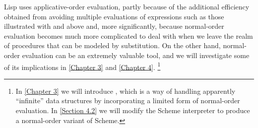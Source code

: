 Lisp uses applicative-order evaluation, partly because of the additional efficiency obtained from avoiding multiple evaluations of expressions such as those illustrated with  and  above and, more significantly, because normal-order evaluation becomes much more complicated to deal with when we leave the realm of procedures that can be modeled by substitution.
On the other hand, normal-order evaluation can be an extremely valuable tool, and we will investigate some of its implications in \cref{Chapter 3} and \cref{Chapter 4}.%
\footnote{
	In \cref{Chapter 3} we will introduce , which is a way of handling apparently “infinite” data structures by incorporating a limited form of normal-order evaluation.
	In \cref{Section 4.2} we will modify the Scheme interpreter to produce a normal-order variant of Scheme.
}
